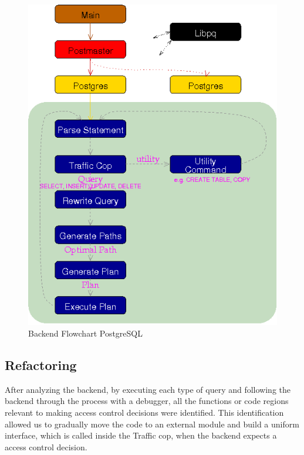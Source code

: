 \newpage
%
\begin{figure}[!ht]
  \centering
    \includegraphics[width=1\textwidth]{img/backend_flowchart.png}
    \caption{Backend Flowchart PostgreSQL \protect \footnotemark}\label{figure:postgresql:architecture}
\end{figure}
%
%
\FloatBarrier

%
\subsection{Refactoring}
%
After analyzing the backend, by executing each type of query and following the backend through the process with a debugger, all the functions or code regions relevant to making access control decisions were identified.
%
This identification allowed us to gradually move the code to an external module and build a uniform interface, which is called inside the Traffic cop, when the backend expects a access control decision. 

